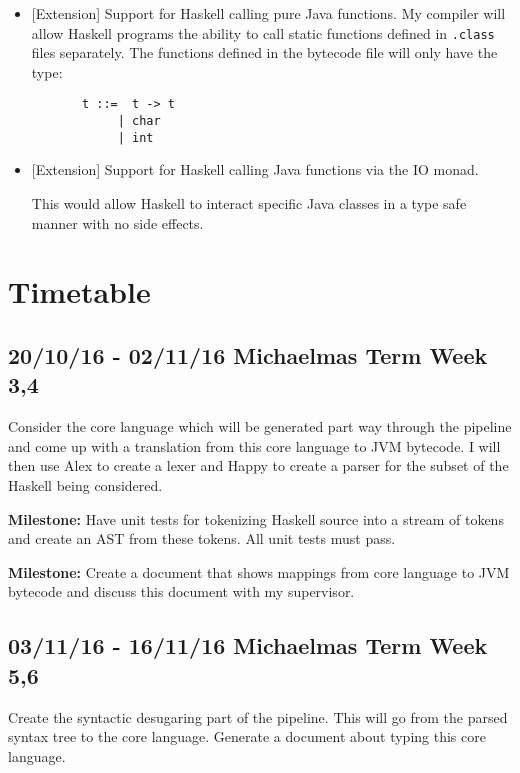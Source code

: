 \documentclass[12pt,a4paper,twoside]{article}
\begin{document}
\begin{itemize}
    \item

      [Extension] Support for Haskell calling pure Java functions.
      My compiler will allow Haskell programs the ability to call static functions defined in \texttt{.class} files separately.
      The functions defined in the bytecode file will only have the type:

      \begin{verbatim}
       t ::=  t -> t
            | char
            | int
      \end{verbatim}

    \item

      [Extension] Support for Haskell calling Java functions via the IO monad.

      This would allow Haskell to interact specific Java classes in a type safe manner with no side effects.

  \end{itemize}

  \section*{Timetable}


    \subsection*{20/10/16 - 02/11/16 \hfill Michaelmas Term Week 3,4}

      Consider the core language which will be generated part way through the pipeline and come up with
      a translation from this core language to JVM bytecode.
      I will then use Alex to create a lexer and Happy to create a parser for the subset of the Haskell being considered.


      \textbf{Milestone:} Have unit tests for tokenizing Haskell source into a stream of tokens and create an AST from these tokens. All unit tests must pass.

      \textbf{Milestone:}
      Create a document that shows mappings from core language to JVM bytecode and discuss this document with my supervisor.


    \subsection*{03/11/16 - 16/11/16 \hfill Michaelmas Term Week 5,6}

      Create the syntactic desugaring part of the pipeline. This will go from the parsed syntax tree to the core language.
      Generate a document about typing this core language.
\end{document}
